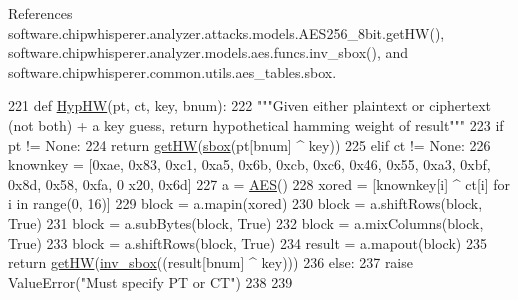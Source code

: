 References software.\+chipwhisperer.\+analyzer.\+attacks.\+models.\+A\+E\+S256\+\_\+8bit.\+get\+H\+W(), software.\+chipwhisperer.\+analyzer.\+models.\+aes.\+funcs.\+inv\+\_\+sbox(), and software.\+chipwhisperer.\+common.\+utils.\+aes\+\_\+tables.\+sbox.


\begin{DoxyCode}
221 \textcolor{keyword}{def }\hyperlink{namespacesoftware_1_1chipwhisperer_1_1analyzer_1_1attacks_1_1models_1_1AES256__8bit_aeed3429f331415549b3d6a0df13a3f00}{HypHW}(pt, ct, key, bnum):
222     \textcolor{stringliteral}{"""Given either plaintext or ciphertext (not both) + a key guess, return hypothetical hamming weight of
       result"""}
223     \textcolor{keywordflow}{if} pt != \textcolor{keywordtype}{None}:
224         \textcolor{keywordflow}{return} \hyperlink{namespacesoftware_1_1chipwhisperer_1_1analyzer_1_1attacks_1_1models_1_1AES256__8bit_a50327d92ebe040ca49b25774be351e22}{getHW}(\hyperlink{namespacesoftware_1_1chipwhisperer_1_1common_1_1utils_1_1aes__tables_ab29ec75e9f1c27e4d0e14aa03b1558ba}{sbox}(pt[bnum] ^ key))
225     \textcolor{keywordflow}{elif} ct != \textcolor{keywordtype}{None}:
226         knownkey = [0xae, 0x83, 0xc1, 0xa5, 0x6b, 0xcb, 0xc6, 0x46, 0x55, 0xa3, 0xbf, 0x8d, 0x58, 0xfa, 0
      x20, 0x6d]
227         a = \hyperlink{classsoftware_1_1chipwhisperer_1_1analyzer_1_1attacks_1_1models_1_1AES256__8bit_1_1AES}{AES}()
228         xored = [knownkey[i] ^ ct[i] \textcolor{keywordflow}{for} i \textcolor{keywordflow}{in} range(0, 16)]
229         block = a.mapin(xored)
230         block = a.shiftRows(block, \textcolor{keyword}{True})
231         block = a.subBytes(block, \textcolor{keyword}{True})
232         block = a.mixColumns(block, \textcolor{keyword}{True})
233         block = a.shiftRows(block, \textcolor{keyword}{True})
234         result = a.mapout(block)
235         \textcolor{keywordflow}{return} \hyperlink{namespacesoftware_1_1chipwhisperer_1_1analyzer_1_1attacks_1_1models_1_1AES256__8bit_a50327d92ebe040ca49b25774be351e22}{getHW}(\hyperlink{namespacesoftware_1_1chipwhisperer_1_1analyzer_1_1models_1_1aes_1_1funcs_abd974ec608fb9868e7bed0e11facf526}{inv\_sbox}((result[bnum] ^ key)))
236     \textcolor{keywordflow}{else}:
237         \textcolor{keywordflow}{raise} ValueError(\textcolor{stringliteral}{"Must specify PT or CT"})
238 
239 
\end{DoxyCode}
\hypertarget{namespacesoftware_1_1chipwhisperer_1_1analyzer_1_1attacks_1_1models_1_1AES256__8bit_a1fc9d650283b04236c62962864126fe0}{}
